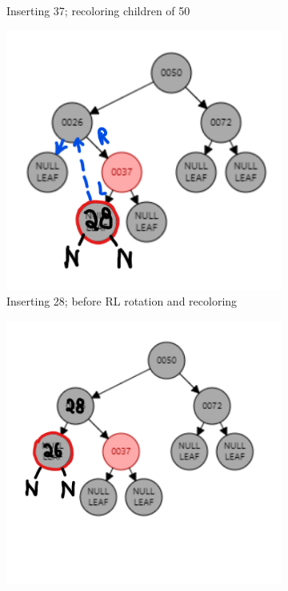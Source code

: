 \documentclass[12pt, a4paper]{article}
\begin{document}
\begin{enumerate}
\begin{figure}[h!]
\begin{subfigure}[b]{0.3\textwidth}
        \caption{Inserting 37; recoloring children of 50}
        \label{fig:3-1-d}
      \end{subfigure}
      \hfill
      \begin{subfigure}[b]{0.3\textwidth}
        \centering
        \includegraphics[width=\textwidth]{3-2-a}
        \caption{Inserting 28; before RL rotation and recoloring}
        \label{fig:3-2-a}
      \end{subfigure}
      \hfill
      \begin{subfigure}[b]{0.3\textwidth}
        \centering
        \includegraphics[width=\textwidth]{3-2-b}

\end{subfigure}
\end{figure}
\end{enumerate}
\end{document}
